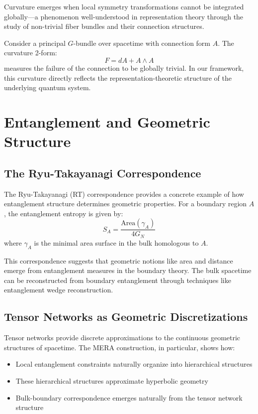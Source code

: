 \documentclass[12pt]{article}
\begin{document}
Curvature emerges when local symmetry transformations cannot be integrated globally—a phenomenon well-understood in representation theory through the study of non-trivial fiber bundles and their connection structures.

Consider a principal $G$-bundle over spacetime with connection form $A$. The curvature 2-form:
\begin{equation}
F = dA + A \wedge A
\end{equation}
measures the failure of the connection to be globally trivial. In our framework, this curvature directly reflects the representation-theoretic structure of the underlying quantum system.

\section{Entanglement and Geometric Structure}

\subsection{The Ryu-Takayanagi Correspondence}

The Ryu-Takayanagi (RT) correspondence provides a concrete example of how entanglement structure determines geometric properties. For a boundary region $A$, the entanglement entropy is given by:
\begin{equation}
S_A = \frac{\text{Area}(\gamma_A)}{4G_N}
\end{equation}
where $\gamma_A$ is the minimal area surface in the bulk homologous to $A$.

This correspondence suggests that geometric notions like area and distance emerge from entanglement measures in the boundary theory. The bulk spacetime can be reconstructed from boundary entanglement through techniques like entanglement wedge reconstruction.

\subsection{Tensor Networks as Geometric Discretizations}

Tensor networks provide discrete approximations to the continuous geometric structures of spacetime. The MERA construction, in particular, shows how:

\begin{itemize}
\item Local entanglement constraints naturally organize into hierarchical structures
\item These hierarchical structures approximate hyperbolic geometry
\item Bulk-boundary correspondence emerges naturally from the tensor network structure
\end{itemize}
\end{document}
